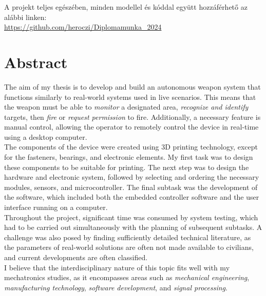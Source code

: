 A projekt teljes egészében, minden modellel és kóddal együtt hozzáférhető az alábbi linken:\\

\url{https://github.com/heroczi/Diplomamunka_2024}


\vfill
\selectenglish


\chapter*{Abstract}

The aim of my thesis is to develop and build an autonomous weapon system that functions similarly to real-world systems used in live scenarios. This means that the weapon must be able to \textsl{monitor} a designated area, \textsl{recognize and identify} targets, then \textsl{fire} or \textsl{request permission} to fire. Additionally, a necessary feature is manual control, allowing the operator to remotely control the device in real-time using a desktop computer.\\

The components of the device were created using 3D printing technology, except for the fasteners, bearings, and electronic elements. My first task was to design these components to be suitable for printing. The next step was to design the hardware and electronic system, followed by selecting and ordering the necessary modules, sensors, and microcontroller. The final subtask was the development of the software, which included both the embedded controller software and the user interface running on a computer.\\

Throughout the project, significant time was consumed by system testing, which had to be carried out simultaneously with the planning of subsequent subtasks. A challenge was also posed by finding sufficiently detailed technical literature, as the parameters of real-world solutions are often not made available to civilians, and current developments are often classified.\\

I believe that the interdisciplinary nature of this topic fits well with my mechatronics studies, as it encompasses areas such as \textsl{mechanical engineering}, \textsl{manufacturing technology}, \textsl{software development}, and \textsl{signal processing}.\\

